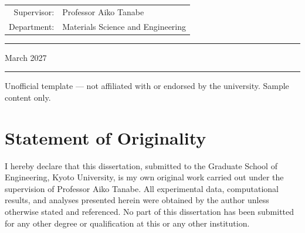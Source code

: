 \documentclass[12pt,a4paper,oneside]{report}
\begin{document}
\begin{titlepage}
\begin{center}
\vspace{0.9cm}

\begin{tabular}{rl}
{\small\color{inkgray}Supervisor:} & {\small\color{inkgray} Professor Aiko Tanabe} \\
{\small\color{inkgray}Department:} & {\small\color{inkgray} Materials Science and Engineering} \\
\end{tabular}

\vspace{0.9cm}

{\color{kyotogold}\rule{0.55\linewidth}{0.8pt}}

\vspace{0.5cm}

{\normalsize\color{inkgray} March 2027}

\vfill

{\color{softgray}\rule{0.9\linewidth}{0.4pt}}

\vspace{0.4cm}

{\footnotesize\color{inkgray!80}
Unofficial template --- not affiliated with or endorsed by the university.
Sample content only.}

\vspace{0.3cm}

\end{center}
\restoregeometry
\end{titlepage}

\setcounter{page}{2}

\chapter*{Statement of Originality}
\thispagestyle{plain}

I hereby declare that this dissertation, submitted to the Graduate School of
Engineering, Kyoto University, is my own original work carried out under the
supervision of Professor Aiko Tanabe. All experimental data, computational
results, and analyses presented herein were obtained by the author unless
otherwise stated and referenced. No part of this dissertation has been
submitted for any other degree or qualification at this or any other
institution.

\vspace{1.4cm}
\end{document}
